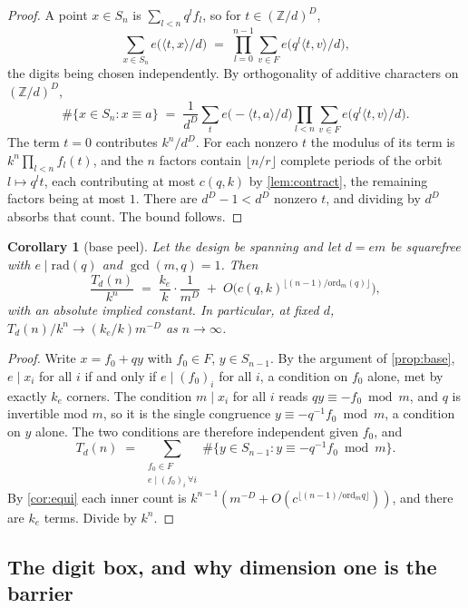 \documentclass[11pt]{amsart}
\newtheorem{corollary}[theorem]{Corollary}
\theoremstyle{definition}
\theoremstyle{remark}
\begin{document}
\begin{proof}
A point $x \in S_n$ is $\sum_{l<n} q^{l} f_l$, so for $t \in (\mathbb{Z}/d)^{D}$,
\[
  \sum_{x \in S_n} e\bigl(\langle t, x\rangle/d\bigr) \;=\; \prod_{l=0}^{n-1} \sum_{v \in F} e\bigl(q^{l}\langle t, v\rangle/d\bigr),
\]
the digits being chosen independently. By orthogonality of additive characters on $(\mathbb{Z}/d)^{D}$,
\[
  \#\{x \in S_n : x \equiv a\} \;=\; \frac{1}{d^{D}} \sum_{t} e\bigl(-\langle t,a\rangle/d\bigr) \prod_{l<n} \sum_{v\in F} e\bigl(q^{l}\langle t,v\rangle/d\bigr).
\]
The term $t=0$ contributes $k^{n}/d^{D}$. For each nonzero $t$ the modulus of its term is $k^{n}\prod_{l<n} f_l(t)$, and the $n$ factors contain $\lfloor n/r \rfloor$ complete periods of the orbit $l \mapsto q^{l}t$, each contributing at most $c(q,k)$ by \cref{lem:contract}, the remaining factors being at most $1$. There are $d^{D}-1 < d^{D}$ nonzero $t$, and dividing by $d^{D}$ absorbs that count. The bound follows.
\end{proof}

\begin{corollary}[base peel]
\label{lem:peel}
Let the design be spanning and let $d = em$ be squarefree with $e \mid \mathrm{rad}(q)$ and $\gcd(m,q)=1$. Then
\[
  \frac{T_d(n)}{k^{n}} \;=\; \frac{k_e}{k}\cdot\frac{1}{m^{D}} \;+\; O\bigl(c(q,k)^{\lfloor (n-1)/\mathrm{ord}_m(q)\rfloor}\bigr),
\]
with an absolute implied constant. In particular, at fixed $d$, $T_d(n)/k^{n} \to (k_e/k)m^{-D}$ as $n \to \infty$.
\end{corollary}

\begin{proof}
Write $x = f_0 + qy$ with $f_0 \in F$, $y \in S_{n-1}$. By the argument of \cref{prop:base}, $e \mid x_i$ for all $i$ if and only if $e \mid (f_0)_i$ for all $i$, a condition on $f_0$ alone, met by exactly $k_e$ corners. The condition $m \mid x_i$ for all $i$ reads $qy \equiv -f_0 \bmod m$, and $q$ is invertible mod $m$, so it is the single congruence $y \equiv -q^{-1}f_0 \bmod m$, a condition on $y$ alone. The two conditions are therefore independent given $f_0$, and
\[
  T_d(n) \;=\; \sum_{\substack{f_0 \in F \\ e \mid (f_0)_i\ \forall i}} \#\{y \in S_{n-1} : y \equiv -q^{-1}f_0 \bmod m\}.
\]
By \cref{cor:equi} each inner count is $k^{n-1}(m^{-D} + O(c^{\lfloor (n-1)/\mathrm{ord}_m q\rfloor}))$, and there are $k_e$ terms. Divide by $k^{n}$.
\end{proof}

\subsection{The digit box, and why dimension one is the barrier}
\end{document}
